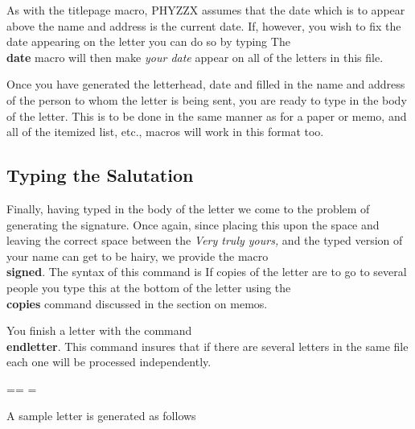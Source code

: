 As with the titlepage macro, PHYZZX assumes that the date which is
to appear above the name and address is the current date.
If, however, you wish to fix the date appearing on the letter you
can do so by typing
The {\bf \\date} macro will then make {\it your date} appear on all
of the letters in this file.
 
Once you have generated the letterhead, date and filled in the name
and address of the person to whom the letter is being sent,
you are ready to type in the body of the letter.
This is to be done in the same manner as for a paper or memo,
and all of the itemized list, etc., macros will work in this format
too.
 
\subsection{Typing the Salutation}
 
Finally, having typed in the body of the letter we come to the
problem of generating the signature.
Once again, since placing this upon the space and leaving the
correct space between the {\it Very truly yours,\/} and
the typed version of your name can get to be hairy, we provide the
macro {\bf \\signed}.
The syntax of this command is
If copies of the letter are to go to several people you type this
at the bottom of the letter using the {\bf \\copies} command
discussed in the section on memos.
 
You finish a letter with the command {\bf \\endletter}.
This command insures that if there are several letters in the same
file each one will be processed independently.
 
\lastpage=\pagenumber  \lastchap=\chapternumber
\lastsection=\sectionnumber \let\lastchapterlabel=\chapterlabel
 
A sample letter is generated as follows
 
